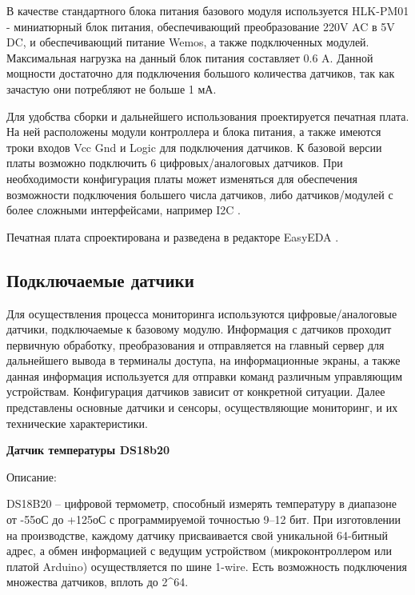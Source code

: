 В качестве стандартного блока питания базового модуля используется HLK-PM01 - миниатюрный блок питания, обеспечивающий преобразование 220V AC в 5V DC, и обеспечивающий питание Wemos, а также подключенных модулей.
Максимальная нагрузка на данный блок питания составляет 0.6 A. Данной мощности достаточно для подключения большого количества датчиков, так как зачастую они потребляют не больше 1 мА.

Для удобства сборки и дальнейшего использования проектируется печатная плата.
На ней расположены модули контроллера и блока питания, а также имеются троки входов Vcc Gnd и Logic для подключения датчиков.
К базовой версии платы возможно подключить 6 цифровых/аналоговых датчиков.
При необходимости конфигурация платы может изменяться для обеспечения возможности подключения большего числа датчиков, либо датчиков/модулей с более сложными интерфейсами, например I2C .

Печатная плата спроектирована и разведена в редакторе EasyEDA .

\subsection{Подключаемые датчики}
Для осуществления процесса мониторинга используются цифровые/аналоговые датчики, подключаемые к базовому модулю.
Информация с датчиков проходит первичную обработку, преобразования и отправляется на главный сервер для дальнейшего вывода в терминалы доступа, на информационные экраны, а также данная информация используется для отправки команд различным управляющим устройствам.
Конфигурация датчиков зависит от конкретной ситуации.
Далее представлены основные датчики и сенсоры, осуществляющие мониторинг, и их технические характеристики.

\textbf{Датчик температуры DS18b20}

Описание:

DS18B20 – цифровой термометр, способный измерять температуру в диапазоне от -55оС до +125оС с программируемой точностью 9--12 бит.
При изготовлении на производстве, каждому датчику присваивается свой уникальной 64-битный адрес, а обмен информацией с ведущим устройством (микроконтроллером или платой Arduino) осуществляется по шине 1-wire.
Есть возможность подключения множества датчиков, вплоть до 2^{64}.

